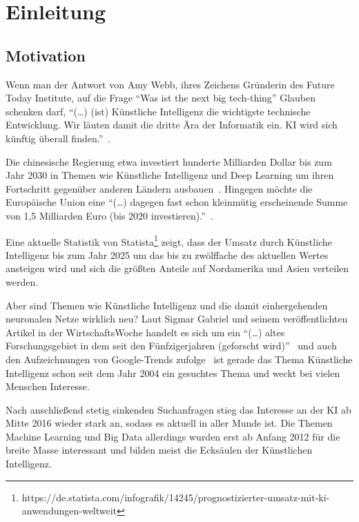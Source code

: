 \chapter{Einleitung}
\label{ch:einleitung}

\section{Motivation}
\label{sec:motivation}
Wenn man der Antwort von Amy Webb, ihres Zeichens Gründerin des Future Today Institute, auf die Frage \enquote{Was ist
the next big tech-thing} Glauben schenken darf, \enquote{(\ldots) (ist) Künstliche Intelligenz die wichtigste technische
Entwicklung. Wir läuten damit die dritte Ära der Informatik ein. KI wird sich künftig überall
finden.}~\cite{article_einleitung_dub_aw}.

Die chinesische Regierung etwa investiert hunderte Milliarden Dollar bis zum Jahr 2030 in Themen wie Künstliche
Intelligenz und Deep Learning um ihren Fortschritt gegenüber anderen Ländern ausbauen~\cite{article_einleitung_css}.
Hingegen möchte die Europäische Union eine \enquote{(\ldots) dagegen fast schon kleinmütig erscheinende Summe von 1,5
Milliarden Euro (bis 2020 investieren).}~\cite{article_einleitung_ww_sg}.

Eine aktuelle Statistik von
Statista\footnote{https://de.statista.com/infografik/14245/prognostizierter-umsatz-mit-ki-anwendungen-weltweit} zeigt,
dass der Umsatz durch Künstliche Intelligenz bis zum Jahr 2025 um das bis zu zwölffache des aktuellen Wertes ansteigen
wird und sich die größten Anteile auf Nordamerika und Asien verteilen werden.

Aber sind Themen wie Künstliche Intelligenz und die damit einhergehenden neuronalen Netze wirklich neu? Laut Sigmar
Gabriel und seinem veröffentlichten Artikel in der WirtschaftsWoche handelt es sich um ein \enquote{(\ldots) altes
Forschungsgebiet in dem seit den Fünfzigerjahren (geforscht wird)}~\cite{article_einleitung_ww_sg} und auch den
Aufzeichnungen von Google-Trends zufolge~\cite{online_einleitung_googletrends} ist gerade das Thema Künstliche
Intelligenz schon seit dem Jahr 2004 ein gesuchtes Thema und weckt bei vielen Menschen Interesse.

Nach anschließend stetig sinkenden Suchanfragen stieg das Interesse an der KI ab Mitte 2016 wieder stark an, sodass es
aktuell in aller Munde ist. Die Themen Machine Learning und Big Data allerdings wurden erst ab Anfang 2012 für die
breite Masse interessant und bilden meist die Ecksäulen der Künstlichen Intelligenz.

